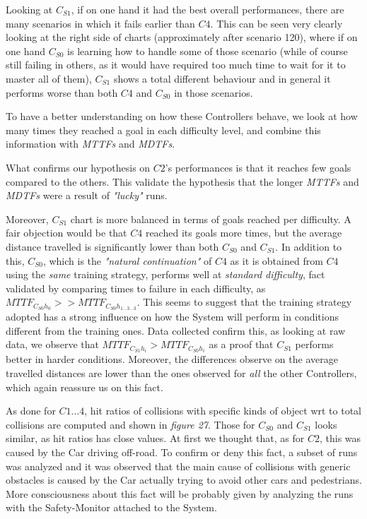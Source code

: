 Looking at $C_{S1}$, if on one hand it had the best overall performances, there are many scenarios in which it fails earlier than $C4$. This can be seen very clearly looking at the right side of charts (approximately after scenario 120), where if on one hand $C_{S0}$ is learning how to handle some of those scenario (while of course still failing in others, as it would have required too much time to wait for it to master all of them), $C_{S1}$ shows a total different behaviour and in general it performs worse than both $C4$ and $C_{S0}$ in those scenarios.


To have a better understanding on how these Controllers behave, we look at how many times they reached a goal in each difficulty level, and combine this information with \textsl{MTTFs} and \textsl{MDTFs}.

What confirms our hypothesis on $C2$'s performances is that it reaches few goals compared to the others. This validate the hypothesis that the longer \textsl{MTTFs} and \textsl{MDTFs} were a result of \textsl{"lucky"} runs.

Moreover, $C_{S1}$ chart is more balanced in terms of goals reached per difficulty. A fair objection would be that $C4$ reached its goals more times, but the average distance travelled is significantly lower than both $C_{S0}$ and $C_{S1}$. In addition to this, $C_{S0}$, which is the \textsl{"natural continuation"} of $C4$ as it is obtained from $C4$ using the \textsl{same} training strategy, performs well at \textsl{standard difficulty}, fact validated by comparing times to failure in each difficulty, as $MTTF_{C_{S0}h_{0}} >> MTTF_{C_{S0}h_{1\dots 3\dots 3}}$.
This seems to suggest that the training strategy adopted has a strong influence on how the System will perform in conditions different from the training ones. Data collected confirm this, as looking at raw data, we observe that $MTTF_{C_{S1}h_{i}} > MTTF_{C_{S0}h_{i}}$ as a proof that $C_{S1}$ performs better in harder conditions. Moreover, the differences observe on the average travelled distances are lower than the ones observed for \textsl{all} the other Controllers, which again reassure us on this fact.

As done for $C1\dots 4$, hit ratios of collisions with specific kinds of object wrt to total collisions are computed and shown in \textsl{figure 27}. Those for $C_{S0}$ and $C_{S1}$ looks similar, as hit ratios has close values. At first we thought that, as for $C2$, this was caused by the Car driving off-road. To confirm or deny this fact, a subset of runs was analyzed and it was observed that the main cause of collisions with generic obstacles is caused by the Car actually trying to avoid other cars and pedestrians. More consciousness about this fact will be probably given by analyzing the runs with the Safety-Monitor attached to the System.

